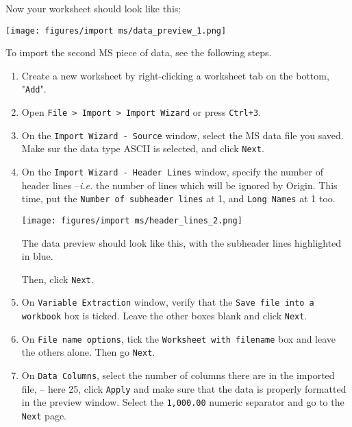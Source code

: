 \documentclass[a4paper, 11pt, raggedright, parskip]{tufte-style-article}
\begin{document}
\newpage

Now your worksheet should look like this:

\texttt{[image: figures/import ms/data\_preview\_1.png]}



To import the second MS piece of data, see the following steps.

\begin{enumerate}

\item Create a new worksheet by right-clicking a worksheet tab on the bottom, "\texttt{Add}".

\item Open \texttt{File > Import > Import Wizard} or press \texttt{Ctrl+3}.

\item On the \texttt{Import Wizard - Source} window, select the MS data file you saved. Make sur the data type ASCII is selected, and click \texttt{Next}.

\item On the \texttt{Import Wizard - Header Lines} window, specify the number of header lines --\textit{i.e.} the number of lines which will be ignored by Origin. This time, put the \texttt{Number of subheader lines} at 1, and \texttt{Long Names} at 1 too.

\texttt{[image: figures/import ms/header\_lines\_2.png]}

The data preview should look like this, with the subheader lines highlighted in blue.

Then, click \texttt{Next}.

\item On \texttt{Variable Extraction} window, verify that the \texttt{Save file into a workbook} box is ticked. Leave the other boxes blank and click \texttt{Next}. 

\item On \texttt{File name options}, tick the \texttt{Worksheet with filename} box and leave the others alone. Then go \texttt{Next}.

\item On \texttt{Data Columns}, select the number of columns there are in the imported file, -- here 25, click \texttt{Apply} and make sure that the data is properly formatted in the preview window. Select the \texttt{1,000.00} numeric separator and go to the \texttt{Next} page.


\end{enumerate}
\end{document}

